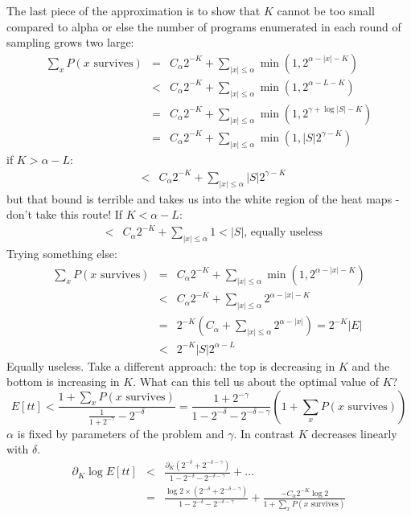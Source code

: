 \documentclass{article}
\begin{document}
The last piece of the approximation is to show that $K$ cannot be too small compared to alpha or else the number of programs enumerated in each round of sampling grows two large:
\begin{eqnarray}
  \sum_x P(x\text{ survives})& = &C_\alpha 2^{-K} + \sum_{|x|\leq \alpha}\min (1,2^{\alpha - |x| - K})\\
  & < &C_\alpha 2^{-K} + \sum_{|x|\leq \alpha}\min (1,2^{\alpha - L - K})\\
   &= &C_\alpha 2^{-K} + \sum_{|x|\leq \alpha}\min (1,2^{\gamma + \log |S| - K})\\
  &= &C_\alpha 2^{-K} + \sum_{|x|\leq \alpha}\min (1,|S| 2^{\gamma - K})
\end{eqnarray}
if $K > \alpha - L$:
\begin{eqnarray}
  & < &C_\alpha 2^{-K} + \sum_{|x|\leq \alpha}|S| 2^{\gamma - K}  
\end{eqnarray}
but that bound is terrible and takes us into the white region of the heat maps - don't take this route! If $K < \alpha - L$:
\begin{eqnarray}
  & < &C_\alpha 2^{-K} + \sum_{|x|\leq \alpha}1 < |S|\text{, equally useless}
\end{eqnarray}
Trying something else:
\begin{eqnarray}
  \sum_x P(x\text{ survives})& = &C_\alpha 2^{-K} + \sum_{|x|\leq \alpha}\min (1,2^{\alpha - |x| - K})\\
  & < &C_\alpha 2^{-K} + \sum_{|x|\leq \alpha} 2^{\alpha - |x|- K}\\
   &= &2^{-K}(C_\alpha + \sum_{|x|\leq \alpha}2^{\alpha - |x|}) = 2^{-K}|E|\\
& < &2^{-K}|S|2^{\alpha - L}
\end{eqnarray}
Equally useless. Take a different approach: the top is decreasing in $K$ and the bottom is increasing in $K$.
What can this tell us about the optimal value of $K$?
$$
E[tt] < \frac{1 + \sum_x P(x\text{ survives})}{\frac{1}{1 + 2^{ - \gamma}} - 2^{ - \delta}} = \frac{1 + 2^{ - \gamma}}{1 - 2^{ - \delta} - 2^{ - \delta - \gamma}}(1 + \sum_x P(x\text{ survives}))
$$
$\alpha$ is fixed by parameters of the problem and $\gamma$. In contrast $K$ decreases linearly with $\delta$.
\begin{eqnarray}
  \partial_K \log E[tt] &<& \frac{\partial_K (2^{-\delta}+2^{ - \delta - \gamma})}{1 - 2^{ - \delta} - 2^{ - \delta - \gamma}}+...\\
  & = &   \frac{\log 2 \times (2^{-\delta} +2^{ - \delta - \gamma})}{1 - 2^{ - \delta} - 2^{ - \delta - \gamma}}+
\frac{-C_\alpha 2^{-K}\log 2 }{1 + \sum_x P(x\text{ survives})}
  \\
  \end{eqnarray}
\end{document}

